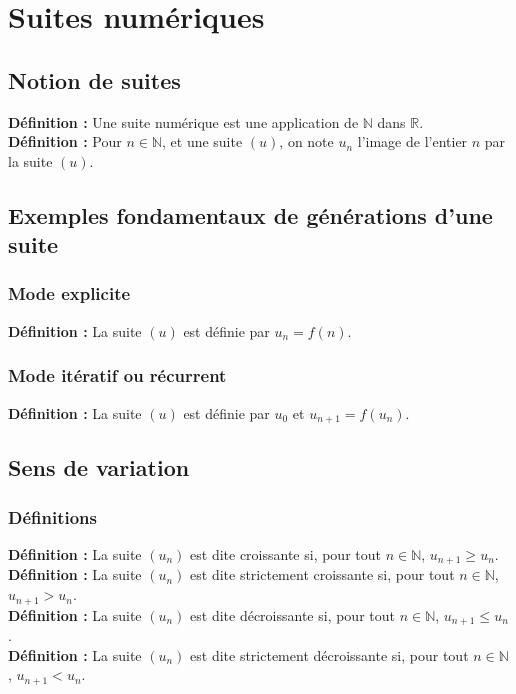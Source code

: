 \documentclass[a4paper,titlepage]{article}
\let\oldsection\section
\renewcommand\section{\clearpage\oldsection}
\begin{document}
\section{Suites numériques}
    \subsection{Notion de suites}
        \textbf{Définition :} Une suite numérique est une application de $\mathbb{N}$ dans $\mathbb{R}$.
        \\
        \textbf{Définition :} Pour $n\in\mathbb{N}$, et une suite $\left(u\right)$, on note $u_{n}$ l’image de l’entier $n$ par la suite $\left(u\right)$.
    \subsection{Exemples fondamentaux de générations d’une suite}
        \subsubsection{Mode explicite}
            \textbf{Définition :} La suite $\left(u\right)$ est définie par $u_{n}=f\left(n\right)$.
        \subsubsection{Mode itératif ou récurrent}
            \textbf{Définition :} La suite $\left(u\right)$ est définie par $u_{0}$ et $u_{n+1}=f\left(u_{n}\right)$.
    \subsection{Sens de variation}
        \subsubsection{Définitions}
            \textbf{Définition :} La suite $\left(u_{n}\right)$ est dite croissante si, pour tout $n\in\mathbb{N}$, $u_{n+1}\geqslant u_{n}$.
            \\
            \textbf{Définition :} La suite $\left(u_{n}\right)$ est dite strictement croissante si, pour tout $n\in\mathbb{N}$, $u_{n+1}>u_{n}$.
            \\
            \textbf{Définition :} La suite $\left(u_{n}\right)$ est dite décroissante si, pour tout $n\in\mathbb{N}$, $u_{n+1}\leqslant u_{n}$.
            \\
            \textbf{Définition :} La suite $\left(u_{n}\right)$ est dite strictement décroissante si, pour tout $n\in\mathbb{N}$, $u_{n+1}<u_{n}$.
\end{document}
